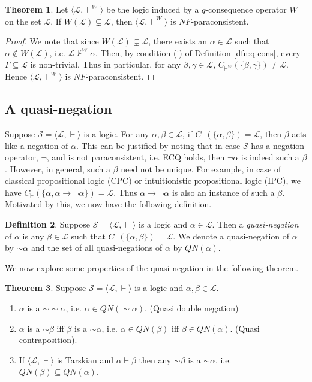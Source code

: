 \documentclass[submission]{eptcs}
\newcommand{\lang}{\mathcal{L}}
\newcommand{\limp}{\longrightarrow}
\newcommand{\qneg}{\sim\!}
\theoremstyle{definition}
\newtheorem{thm}{Theorem}[section]
\newtheorem{dfn}[thm]{Definition}
\begin{document}
\begin{thm}
Let $\langle\lang,\vdash^W\rangle$ be the logic induced by a $q$-consequence operator $W$ on the set $\lang$. If $W(\lang)\subsetneq\lang$, then $\langle\lang,\vdash^W\rangle$ is $NF$-paraconsistent.
\end{thm}

\begin{proof}
We note that since $W(\lang)\subsetneq\lang$, there exists an $\alpha\in\lang$ such that $\alpha\notin W(\lang)$, i.e. $\lang\not\vdash^W\alpha$. Then, by condition (i) of Definition \ref{dfn:q-cons}, every $\Gamma\subseteq\lang$ is non-trivial. Thus in particular, for any $\beta,\gamma\in\lang$, $C_{\vdash^W}(\{\beta,\gamma\})\neq\lang$. Hence $\langle\lang,\vdash^W\rangle$ is $NF$-paraconsistent.
\end{proof}


\subsection{A quasi-negation}
Suppose $\mathcal{S}=\langle\lang,\vdash\rangle$ is a logic. For any $\alpha,\beta\in\lang$, if $C_\vdash(\{\alpha,\beta\})=\lang$, then $\beta$ acts like a negation of $\alpha$. This can be justified by noting that in case $\mathcal{S}$ has a negation operator, $\neg$, and is not paraconsistent, i.e. ECQ holds, then $\neg\alpha$ is indeed such a $\beta$. However, in general, such a $\beta$ need not be unique. For example, in case of classical propositional logic (CPC) or intuitionistic propositional logic (IPC), we have $C_\vdash(\{\alpha,\alpha\limp\neg\alpha\})=\lang$. Thus $\alpha\limp\neg\alpha$ is also an instance of such a $\beta$. Motivated by this, we now have the following definition.

\begin{dfn}\label{dfn:quasi-neg}
Suppose $\mathcal{S}=\langle\lang,\vdash\rangle$ is a logic and $\alpha\in\lang$. Then a \emph{quasi-negation} of $\alpha$ is any $\beta\in\lang$ such that $C_\vdash(\{\alpha,\beta\})=\lang$. We denote a quasi-negation of $\alpha$ by $\qneg\alpha$ and the set of all quasi-negations of $\alpha$ by $QN(\alpha)$.
\end{dfn}

We now explore some properties of the quasi-negation in the following theorem.

\begin{thm}
Suppose $\mathcal{S}=\langle\lang,\vdash\rangle$ is a logic and $\alpha,\beta\in\lang$. 
\begin{enumerate}[label=(\arabic*)]
    \item $\alpha$ is a $\qneg\qneg\alpha$, i.e. $\alpha\in QN(\qneg\alpha)$. (Quasi double negation)
    
    \item $\alpha$ is a $\qneg\beta$ iff $\beta$ is a $\qneg\alpha$, i.e. $\alpha\in QN(\beta)$ iff $\beta\in QN(\alpha)$. (Quasi contraposition).
    \item If $\langle\lang,\vdash\rangle$ is Tarskian and $\alpha\vdash\beta$ then any $\qneg\beta$ is a $\qneg\alpha$, i.e. $QN(\beta)\subseteq QN(\alpha)$. 
\end{enumerate}
\end{thm}
\end{document}
